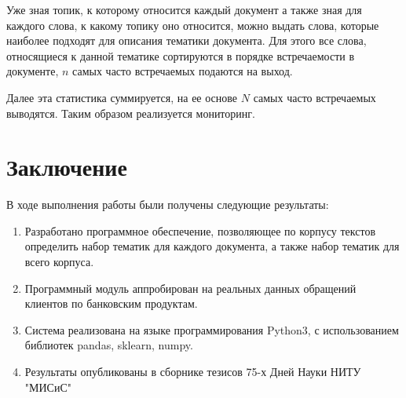 \documentclass[a4paper,12pt,preview]{report} %
\begin{document}
	Уже зная топик, к которому относится каждый документ а также зная для каждого слова, к какому топику оно относится, можно выдать слова, которые наиболее подходят для описания тематики документа. Для этого все слова, относящиеся к данной тематике сортируются в порядке встречаемости в документе, $n$ самых часто встречаемых подаются на выход. 
	
	Далее эта статистика суммируется, на ее основе $N$ самых часто встречаемых выводятся. Таким образом реализуется мониторинг.
	
	
	
	
	\chapter*{Заключение}
	
	В ходе выполнения работы были получены следующие результаты:
	
	\begin{enumerate}		
		\item Разработано программное обеспечение, позволяющее по корпусу текстов определить набор тематик для каждого документа, а также набор тематик для всего корпуса.	
		
		\item Программный модуль аппробирован на реальных данных обращений клиентов по банковским продуктам.
		
		\item Система реализована на языке программирования Python3, с использованием библиотек pandas, sklearn, numpy.
		
		\item Результаты опубликованы в сборнике тезисов 75-х Дней Науки НИТУ "МИСиС"
		
	\end{enumerate}
	
	
	
\end{document}
